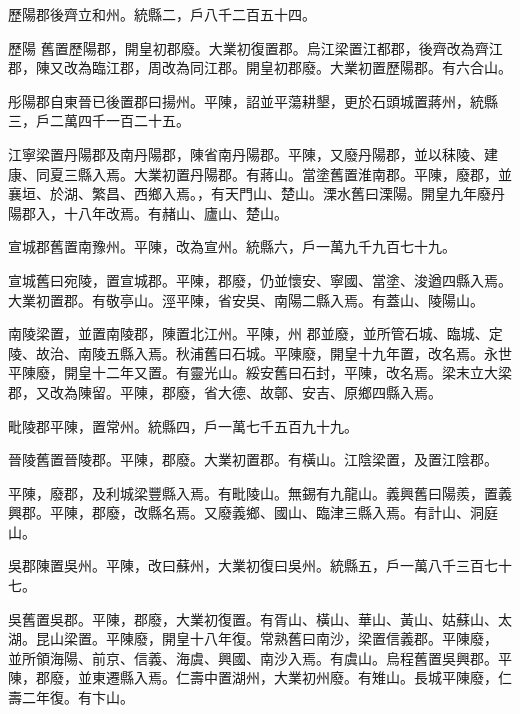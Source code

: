 \begin{pinyinscope}
 歷陽郡後齊立和州。統縣二，戶八千二百五十四。



 歷陽
 舊置歷陽郡，開皇初郡廢。大業初復置郡。烏江梁置江都郡，後齊改為齊江郡，陳又改為臨江郡，周改為同江郡。開皇初郡廢。大業初置歷陽郡。有六合山。



 彤陽郡自東晉已後置郡曰揚州。平陳，詔並平蕩耕墾，更於石頭城置蔣州，統縣三，戶二萬四千一百二十五。



 江寧梁置丹陽郡及南丹陽郡，陳省南丹陽郡。平陳，又廢丹陽郡，並以秣陵、建康、同夏三縣入焉。大業初置丹陽郡。有蔣山。當塗舊置淮南郡。平陳，廢郡，並襄垣、於湖、繁昌、西鄉入焉。，有天門山、楚山。溧水舊曰溧陽。開皇九年廢丹陽郡入，十八年改焉。有赭山、廬山、楚山。



 宣城郡舊置南豫州。平陳，改為宣州。統縣六，戶一萬九千九百七十九。



 宣城舊曰宛陵，置宣城郡。平陳，郡廢，仍並懷安、寧國、當塗、浚遒四縣入焉。大業初置郡。有敬亭山。涇平陳，省安吳、南陽二縣入焉。有蓋山、陵陽山。



 南陵梁置，並置南陵郡，陳置北江州。平陳，州
 郡並廢，並所管石城、臨城、定陵、故治、南陵五縣入焉。秋浦舊曰石城。平陳廢，開皇十九年置，改名焉。永世平陳廢，開皇十二年又置。有靈光山。綏安舊曰石封，平陳，改名焉。梁末立大梁郡，又改為陳留。平陳，郡廢，省大德、故鄣、安吉、原鄉四縣入焉。



 毗陵郡平陳，置常州。統縣四，戶一萬七千五百九十九。



 晉陵舊置晉陵郡。平陳，郡廢。大業初置郡。有橫山。江陰梁置，及置江陰郡。



 平陳，廢郡，及利城梁豐縣入焉。有毗陵山。無錫有九龍山。義興舊曰陽羨，置義興郡。平陳，郡廢，改縣名焉。又廢義鄉、國山、臨津三縣入焉。有計山、洞庭山。



 吳郡陳置吳州。平陳，改曰蘇州，大業初復曰吳州。統縣五，戶一萬八千三百七十七。



 吳舊置吳郡。平陳，郡廢，大業初復置。有胥山、橫山、華山、黃山、姑蘇山、太湖。昆山梁置。平陳廢，開皇十八年復。常熟舊曰南沙，梁置信義郡。平陳廢，
 並所領海陽、前京、信義、海虞、興國、南沙入焉。有虞山。烏程舊置吳興郡。平陳，郡廢，並東遷縣入焉。仁壽中置湖州，大業初州廢。有雉山。長城平陳廢，仁壽二年復。有卞山。




\end{pinyinscope}
